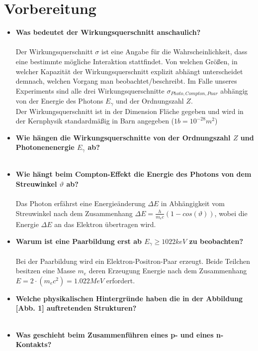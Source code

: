 \documentclass{article}
\begin{document}
	\section{Vorbereitung}
	\begin{itemize}
	\item \textbf{Was bedeutet der Wirkungsquerschnitt anschaulich?}\\\\
	Der Wirkungsquerschnitt $\sigma$ ist eine Angabe für die Wahrscheinlichkeit, dass eine bestimmte mögliche Interaktion stattfindet. Von welchen Größen, in welcher Kapazität der Wirkungsquerschnitt explizit abhängt unterscheidet demnach, welchen Vorgang man beobachtet/beschreibt. Im Falle unseres Experiments sind alle drei Wirkungsquerschnitte $\sigma_{Photo,Compton,Paar}$ abhängig von der Energie des Photons $E_\gamma$ und der Ordnungszahl $Z$.\\
	Der Wirkungsquerschnitt ist in der Dimension Fläche gegeben und wird in der Kernphysik standardmäßig in Barn angegeben ($1b=10^{-28}m^2$)   
	\item \textbf{Wie hängen die Wirkungsquerschnitte von der Ordnungszahl \boldmath$Z$ und Photonenenergie \boldmath$E_\gamma$ ab?}\\\\
	\item \textbf{Wie hängt beim Compton-Effekt die Energie des Photons von dem Streuwinkel \boldmath$\vartheta$ ab?}\\\\
	Das Photon erfährst eine Energieänderung $\Delta E$ in Abhängigkeit vom Streuwinkel nach dem Zusammenhang $\Delta E=\frac{h}{m_ec}(1-cos(\vartheta))$, wobei die Energie $\Delta E$ an das Elektron übertragen wird.
	\item \textbf{Warum ist eine Paarbildung erst ab \boldmath$E_\gamma\geq1022keV$ zu beobachten?}\\\\
	Bei der Paarbildung wird ein Elektron-Positron-Paar erzeugt. Beide Teilchen besitzen eine Masse $m_e$ deren Erzeugung Energie nach dem Zusammenhang $E=2\cdot(m_ec^2)=1.022MeV$ erfordert.  
	\item \textbf{Welche physikalischen Hintergründe haben die in der Abbildung [Abb. 1] auftretenden Strukturen?}\\\\
	\item \textbf{Was geschieht beim Zusammenführen eines p- und eines n-Kontakts?}\\\\

\end{itemize}
\end{document}
